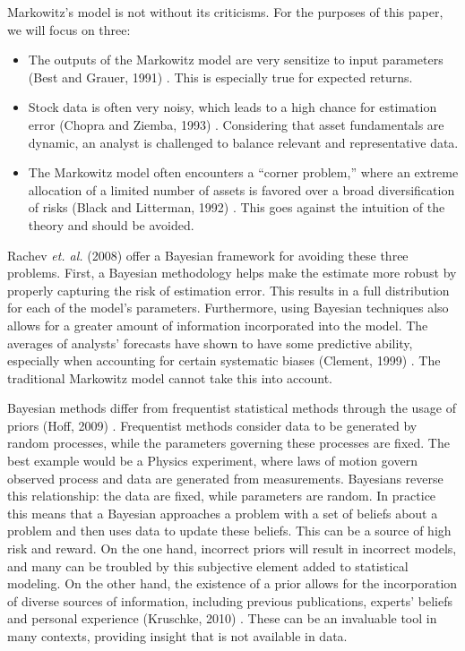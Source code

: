 \documentclass[a4paper]{article}\usepackage[]{graphicx}\usepackage[]{color}
\begin{document}
Markowitz's model is not without its criticisms. For the purposes of this paper, we will focus on three:

\begin{itemize}
    \item The outputs of the Markowitz model are very sensitize to input parameters (Best and Grauer, 1991) \cite{best91}. This is especially true for expected returns.
    \item Stock data is often very noisy, which leads to a high chance for estimation error (Chopra and Ziemba, 1993) \cite{chopra93}. Considering that asset fundamentals are dynamic, an analyst is challenged to balance relevant and representative data. 
    \item The Markowitz model often encounters a ``corner problem,'' where an extreme allocation of a limited number of assets is favored over a broad diversification of risks (Black and Litterman, 1992) \cite{black92}. This goes against the intuition of the theory and should be avoided.
\end{itemize}

Rachev \textit{et. al.} (2008) \cite{rachev08} offer a Bayesian framework for avoiding these three problems. First, a Bayesian methodology helps make the estimate more robust by properly capturing the risk of estimation error. This results in a full distribution for each of the model's parameters. Furthermore, using Bayesian techniques also allows for a greater amount of information incorporated into the model. The averages of analysts' forecasts have shown to have some predictive ability, especially when accounting for certain systematic biases (Clement, 1999) \cite{clement99}. The traditional Markowitz model cannot take this into account.

Bayesian methods differ from frequentist statistical methods through the usage of priors (Hoff, 2009) \cite{hoff09}. Frequentist methods consider data to be generated by random processes, while the parameters governing these processes are fixed. The best example would be a Physics experiment, where laws of motion govern observed process and data are generated from measurements. Bayesians reverse this relationship: the data are fixed, while parameters are random. In practice this means that a Bayesian approaches a problem with a set of beliefs about a problem and then uses data to update these beliefs. This can be a source of high risk and reward. On the one hand, incorrect priors will result in incorrect models, and many can be troubled by this subjective element added to statistical modeling. On the other hand, the existence of a prior allows for the incorporation of diverse sources of information, including previous publications, experts' beliefs and personal experience (Kruschke, 2010) \cite{kruschke, 2010}. These can be an invaluable tool in many contexts, providing insight that is not available in data.
\end{document}
